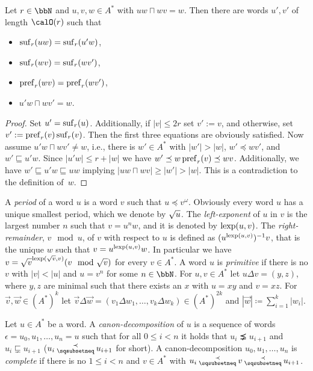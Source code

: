 \begin{lemma}\label{lem:short_ends_construction}
	Let $r\in\bbN$ and $u,v,w \in A^\ast$ with $uw\sqcap wv = w$. %
	Then there are words $u',v'$ of length $\calO(r)$ such that 
	\begin{itemize}
		\item $\operatorname{suf}_r(uw) = \operatorname{suf}_r(u'w)$,
		\item $\operatorname{suf}_r(wv) = \operatorname{suf}_r(wv')$,
		\item $\operatorname{pref}_r(wv) = \operatorname{pref}_r(wv')$,
		\item $u'w\sqcap wv' = w$.
	\end{itemize}
\end{lemma}
\begin{proof}
	Set $u'=\operatorname{suf}_r(u)$. Additionally, if $|v|\leq 2r$ set $v':=v$, and otherwise, set $v':=\operatorname{pref}_r(v)\operatorname{suf}_r(v)$. Then the first three equations are obviously satisfied. Now assume $u'w\sqcap wv'\neq w$, i.e., there is $w'\in A^*$ with $|w'|>|w|$, $w'\preceq wv'$, and $w'\sqsubseteq u'w$. Since $|u'w|\leq r+|w|$ we have $w'\preceq w\operatorname{pref}_r(v)\preceq wv$. Additionally, we have $w'\sqsubseteq u'w\sqsubseteq uw$ implying $|uw\sqcap wv|\geq|w'|>|w|$. This is a contradiction to the definition of~$w$.
\end{proof}

A \emph{period} of a word $u$ is a word $v$ such that $u \preceq v^\omega$. Obviously every word $u$ has a unique smallest period, which we denote by $\sqrt{u}$. The \emph{left-exponent} of $u$ in $v$ is the largest number $n$ such that $v= u^nw$, and it is denoted by $\operatorname{lexp}(u,v)$. The \emph{right-remainder}, $v\mod u$,  of $v$ with respect to $u$ is defined as $(u^{\operatorname{lexp}(u,v)})^{-1}v$, that is the unique $w$ such that $v= u^{\operatorname{lexp}(u,v)}w$.  In particular we have $v= \root{v}^{\lexp(\root{v}, v)}(v \mod \root{v})$ for every $v\in A^\ast$. A word $u$ is \emph{primitive} if there is no $v$ with
$|v| < |u|$ and $u = v^n$ for some $n\in\bbN$.
For $u,v\in A^\ast$ let $u\Delta v = (y,z)$, where $y,z$ are minimal such that there exists an $x$ with $u=xy$ and $v=xz$. For $\vec{v}, \vec{w}\in(A^\ast)^k$ let 
$\vec{v}\Delta\vec{w} = (v_1\Delta w_1,\ldots, v_k\Delta w_k) \in (A^\ast)^{2k}$ and $|\vec{w}| \coloneq \sum_{i=1}^{k}|w_i|$. 

\begin{definition}
	Let $u\in A^\ast$ be a word. A \emph{canon-decomposition} of $u$ is a sequence of words $\epsilon = u_0,u_1,\ldots, u_n = u$ such that for all $0\leq i < n$ it holds that
	$u_i \precneq u_{i+1}$ and $u_i \sqsubsetneq u_{i+1}$ ($u_i \presuf u_{i+1}$ for short). A canon-decomposition $u_0,u_1,\ldots, u_n $ is \emph{complete} if there is no $1\leq i< n$ and $v\in A^\ast$ with $u_i \presuf v \presuf u_{i+1}$.
\end{definition}

